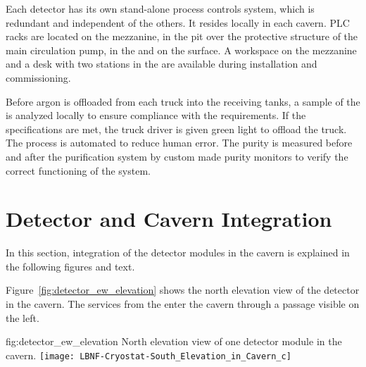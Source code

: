 Each detector has its own stand-alone process controls system, which is
redundant and independent of the others. It resides locally in each
cavern.  PLC racks are located on the mezzanine, in the pit over the
protective structure of the main  circulation pump, in the  and
on the surface. %
A workspace on the mezzanine and a desk with two stations in the   are available
during installation and commissioning.

Before argon is offloaded from each truck into the receiving tanks, a
sample of the  is analyzed locally to ensure compliance with the
requirements. If the specifications are met, the truck driver is given
green light to offload the truck. The process is automated to reduce
human error. The purity is measured before and after the purification
system by custom made purity monitors to verify the correct
functioning of the system.


\section{Detector and Cavern Integration}
\label{sec:fdsp-coord-det-cav-integ}
In this section, integration of the detector modules in the cavern is
explained in the following figures and text.

Figure~\ref{fig:detector_ew_elevation} shows the north
elevation view of the detector in the cavern. The services from the
 enter the cavern through a passage visible on the left.
\begin{dunefigure}{fig:detector_ew_elevation}
  {North elevation view of one detector module in the cavern.}
  \texttt{[image: LBNF-Cryostat-South\_Elevation\_in\_Cavern\_c]}
\end{dunefigure}

